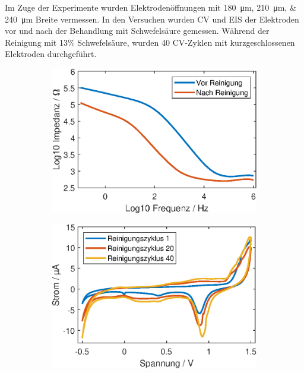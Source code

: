 Im Zuge der Experimente wurden Elektrodenöffnungen mit \SIlist{180;210;240}{\micro\meter} Breite vermessen. In den Versuchen wurden CV und EIS der Elektroden vor und nach der Behandlung mit Schwefelsäure gemessen. Während der Reinigung mit 13\% Schwefelsäure, wurden 40 CV-Zyklen mit kurzgeschlossenen Elektroden durchgeführt.


\begin{figure}[!htb]
\begin{subfigure}[l]{0.31\linewidth}
\centering
\includegraphics[trim=0 0mm 0 0,clip,width=\linewidth]{plot/EIS_180um.eps}
\label{fig:EIS}
\end{subfigure}%
\hspace{4mm}
\begin{subfigure}[c]{0.31\linewidth}
\centering
\includegraphics[trim=0 0mm 0 0,clip,width=\linewidth]{plot/Cleaning_180um.eps}

\end{subfigure}
\end{figure}
